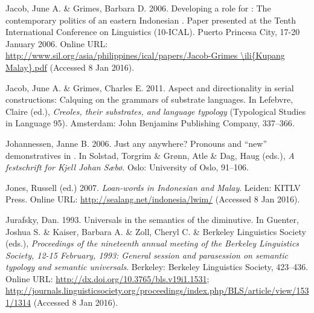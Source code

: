 \begin{styleCitaviBibliographyEntry}
Jacob, June A. \& Grimes, Barbara D. 2006. Developing a role for : The contemporary politics of an eastern Indonesian . Paper presented at the Tenth International Conference on  Linguistics (10-ICAL). Puerto Princesa City, 17-20 January 2006. Online URL: \url{http://www.sil.org/asia/philippines/ical/papers/Jacob-Grimes \ili{Kupang Malay}.pdf} (Accessed 8 Jan 2016).
\end{styleCitaviBibliographyEntry}

\begin{styleCitaviBibliographyEntry}
Jacob, June A. \& Grimes, Charles E. 2011. Aspect and directionality in  serial  constructions: Calquing on the grammars of substrate languages. In Lefebvre, Claire (ed.), \textit{Creoles, their substrates, and language typology} (Typological Studies in Language 95). Amsterdam: John Benjamins Publishing Company, 337–366.
\end{styleCitaviBibliographyEntry}

\begin{styleCitaviBibliographyEntry}
Johannessen, Janne B. 2006. Just any  anywhere? Pronouns and “new” demonstratives in . In Solstad, Torgrim \& Grønn, Atle \& Dag, Haug (eds.), \textit{A festschrift for Kjell Johan Sæbø}. Oslo: University of Oslo, 91–106.
\end{styleCitaviBibliographyEntry}

\begin{styleCitaviBibliographyEntry}
Jones, Russell (ed.) 2007. \textit{Loan-words in Indonesian and Malay}. Leiden: KITLV Press. Online URL: \url{http://sealang.net/indonesia/lwim/} (Accessed 8 Jan 2016).
\end{styleCitaviBibliographyEntry}

\begin{styleCitaviBibliographyEntry}
Jurafsky, Dan. 1993. Universals in the semantics of the diminutive. In Guenter, Joshua S. \& Kaiser, Barbara A. \& Zoll, Cheryl C. \& Berkeley Linguistics Society (eds.), \textit{Proceedings of the nineteenth annual meeting of the Berkeley Linguistics Society, 12-15 February, 1993: General session and parasession on semantic typology and semantic universals}. Berkeley: Berkeley Linguistics Society, 423–436. Online URL: \url{http://dx.doi.org/10.3765/bls.v19i1.1531}; \url{http://journals.linguisticsociety.org/proceedings/index.php/BLS/article/view/1531/1314} (Accessed 8 Jan 2016).
\end{styleCitaviBibliographyEntry}

